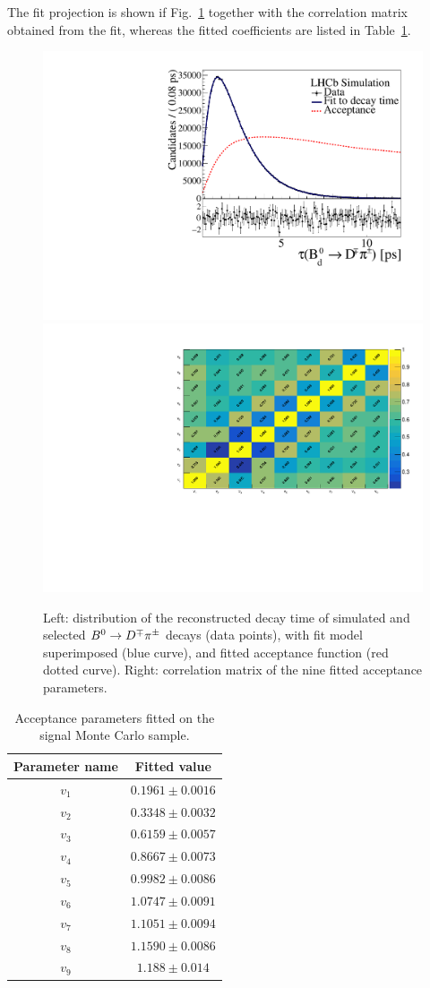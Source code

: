 The fit projection is shown if Fig.~\ref{fig:AcceptanceFitAll} together with the correlation matrix obtained from the fit, whereas the fitted coefficients are listed in Table~\ref{tab:AcceptanceFitAll}.


\begin{figure}[t]
        \centering
        \includegraphics[width=0.44\linewidth]{05DecaytimeFit/figs/MCAcceptance/MCAcceptance.pdf}
        \includegraphics[width=0.52\linewidth]{05DecaytimeFit/figs/MCAcceptance/acceptance_CorrelationMatrix.pdf}
        \vspace{-2mm}
        \caption{Left: distribution of the reconstructed decay time of simulated and selected $B^0\rightarrow D^\mp\pi^\pm$ decays (data points), with fit model superimposed (blue curve), and fitted acceptance function (red dotted curve). Right: correlation matrix of the nine fitted acceptance parameters.}
        \label{fig:AcceptanceFitAll}
\end{figure}

\begin{table}[tb]
\begin{center}
\caption{Acceptance parameters fitted on the signal Monte Carlo sample.}
\begin{tabular}{cc}
\toprule
Parameter name & Fitted value \\
\midrule
$v_{1}$ & $0.1961\pm0.0016$ \\
$v_{2}$ & $0.3348\pm0.0032$ \\
$v_{3}$ & $0.6159\pm0.0057$  \\
$v_{4}$ & $0.8667\pm0.0073$  \\
$v_{5}$ & $0.9982\pm0.0086$  \\
$v_{6}$ & $1.0747\pm0.0091$  \\
$v_{7}$ & $1.1051\pm0.0094$ \\
$v_{8}$ & $1.1590\pm0.0086$ \\
$v_{9}$ & $1.188\pm0.014$ \\
\bottomrule
\end{tabular}
\label{tab:AcceptanceFitAll}
\end{center}
\end{table}
